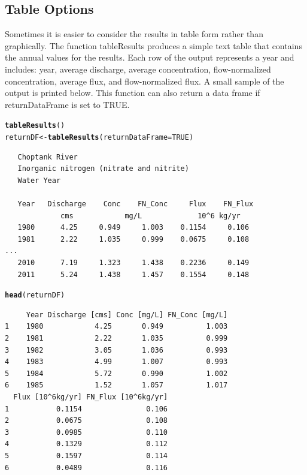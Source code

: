 \documentclass[a4paper,11pt]{article}\usepackage[]{graphicx}\usepackage[]{color}
\makeatletter
\newcommand{\hlnum}[1]{\textcolor[rgb]{0.686,0.059,0.569}{#1}}%
\newcommand{\hlstd}[1]{\textcolor[rgb]{0.345,0.345,0.345}{#1}}%
\newcommand{\hlkwb}[1]{\textcolor[rgb]{0.69,0.353,0.396}{#1}}%
\newcommand{\hlkwc}[1]{\textcolor[rgb]{0.333,0.667,0.333}{#1}}%
\newcommand{\hlkwd}[1]{\textcolor[rgb]{0.737,0.353,0.396}{\textbf{#1}}}%
\newenvironment{kframe}{%
 \def\at@end@of@kframe{}%
 \ifinner\ifhmode%
  \def\at@end@of@kframe{\end{minipage}}%
  \begin{minipage}{\columnwidth}%
 \fi\fi%
 \def\FrameCommand##1{\hskip\@totalleftmargin \hskip-\fboxsep
 \colorbox{shadecolor}{##1}\hskip-\fboxsep
     \hskip-\linewidth \hskip-\@totalleftmargin \hskip\columnwidth}%
 \MakeFramed {\advance\hsize-\width
   \@totalleftmargin\z@ \linewidth\hsize
   \@setminipage}}%
 {\par\unskip\endMakeFramed%
 \at@end@of@kframe}
\newenvironment{knitrout}{}{} %
\makeatother
\begin{document}
\FloatBarrier
\subsection{Table Options}
\label{sec:wrtdsTable}
Sometimes it is easier to consider the results in table form rather than graphically. The function tableResults produces a simple text table that contains the annual values for the results.  Each row of the output represents a year and includes: year, average discharge, average concentration, flow-normalized concentration, average flux, and flow-normalized flux.  A small sample of the output is printed below. This function can also return a data frame if returnDataFrame is set to TRUE.

\begin{knitrout}
\color{fgcolor}\begin{kframe}
\begin{alltt}
\hlkwd{tableResults}\hlstd{()}
\hlstd{returnDF} \hlkwb{<-} \hlkwd{tableResults}\hlstd{(}\hlkwc{returnDataFrame}\hlstd{=}\hlnum{TRUE}\hlstd{)}
\end{alltt}
\end{kframe}
\end{knitrout}

\begin{verbatim}
   Choptank River 
   Inorganic nitrogen (nitrate and nitrite)
   Water Year 

   Year   Discharge    Conc    FN_Conc     Flux    FN_Flux
             cms            mg/L             10^6 kg/yr 
   1980      4.25     0.949     1.003    0.1154     0.106
   1981      2.22     1.035     0.999    0.0675     0.108
...
   2010      7.19     1.323     1.438    0.2236     0.149
   2011      5.24     1.438     1.457    0.1554     0.148
\end{verbatim}



\begin{knitrout}
\color{fgcolor}\begin{kframe}
\begin{alltt}
\hlkwd{head}\hlstd{(returnDF)}
\end{alltt}
\begin{verbatim}
     Year Discharge [cms] Conc [mg/L] FN_Conc [mg/L]
1    1980            4.25       0.949          1.003
2    1981            2.22       1.035          0.999
3    1982            3.05       1.036          0.993
4    1983            4.99       1.007          0.993
5    1984            5.72       0.990          1.002
6    1985            1.52       1.057          1.017
  Flux [10^6kg/yr] FN_Flux [10^6kg/yr]
1           0.1154               0.106
2           0.0675               0.108
3           0.0985               0.110
4           0.1329               0.112
5           0.1597               0.114
6           0.0489               0.116
\end{verbatim}
\end{kframe}
\end{knitrout}
\end{document}
